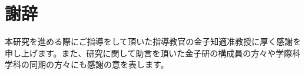 \chapter*{謝辞}

本研究を進める際にご指導をして頂いた指導教官の金子知適准教授に厚く感謝を申し上げます。また、研究に関して助言を頂いた金子研の構成員の方々や学際科学科の同期の方々にも感謝の意を表します。